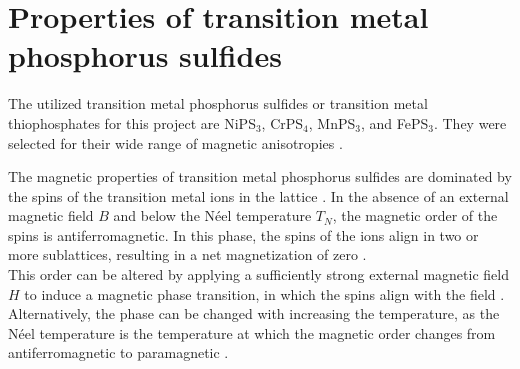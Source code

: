 \documentclass[
	twoside,
	parskip=half,
	a4paper,
]{scrbook}
\begin{document}
\section{Properties of transition metal phosphorus sulfides}
The utilized transition metal phosphorus sulfides or transition metal thiophosphates for this project are NiPS$_3$, CrPS$_4$, MnPS$_3$, and FePS$_3$.
They were selected for their wide range of magnetic anisotropies \cite{MPS_magnetism,CrPS4_magnetic}.

The magnetic properties of transition metal phosphorus sulfides are dominated by the spins of the transition metal ions in the lattice \cite{MPS_magnetism}.
In the absence of an external magnetic field $B$ and below the Néel temperature $T_N$, the magnetic order of the spins is antiferromagnetic.
In this phase, the spins of the ions align in two or more sublattices, resulting in a net magnetization of zero \cite[p.195]{afm}. \\
This order can be altered by applying a sufficiently strong external magnetic field $H$ to induce a magnetic phase transition, in which the spins align with the field \cite{CrPS4_magnetic}.
Alternatively, the phase can be changed with increasing the temperature, as the Néel temperature is the temperature at which the magnetic order changes from antiferromagnetic to paramagnetic \cite{MPS_magnetism, CrPS4_magnetic}.
\end{document}
